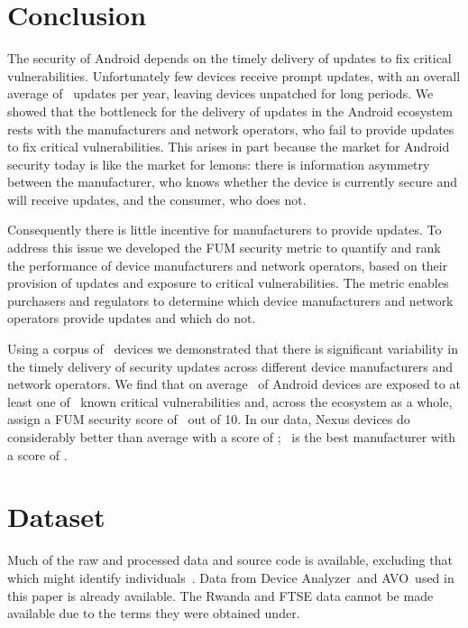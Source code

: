 \documentclass{sig-alternate-2013}
\newcommand{\da}{Device Analyzer}
\newcommand{\avo}{AVO}
\begin{document}
\section{Conclusion}
The security of Android depends on the timely delivery of updates to fix critical vulnerabilities.
Unfortunately few devices receive prompt updates, with an overall average of \daUpdatesPerYearNominal\ updates per year, leaving devices unpatched for long periods.
We showed that the bottleneck for the delivery of updates in the Android ecosystem rests with the manufacturers and network operators, who fail to provide updates to fix critical vulnerabilities.
This arises in part because the market for Android security today is like the market for lemons: there is information asymmetry between the manufacturer, who knows whether the device is currently secure and will receive updates, and the consumer, who does not.

Consequently there is little incentive for manufacturers to provide updates.
To address this issue we developed the FUM security metric to quantify and rank the performance of device manufacturers and network operators, based on their provision of updates and exposure to critical vulnerabilities.
The metric enables purchasers and regulators to determine which device manufacturers and network operators provide updates and which do not.

Using a corpus of \daNumOSDevices\ devices we demonstrated that there is significant variability in the timely delivery of security updates across different device manufacturers and network operators.
We find that on average \daMeanInsecurityPercNominal\ of Android devices are exposed to at least one of \daNumVulnsUsed\ known critical vulnerabilities and, across the ecosystem as a whole, assign a FUM security score of \daSecurityScoreNominal\ out of 10. In our data, Nexus devices do considerably better than average with a score of \daSecScoreBestsummaryScoreNominal; \daSecScoreBestmanufacturer\ is the best manufacturer with a score of \daSecScoreBestmanufacturerScoreNominal.

\section*{Dataset}
Much of the raw and processed data and source code is available, excluding that which might identify individuals~\cite{Thomas2015e}.
Data from \da\ and \avo\ used in this paper is already available.
The Rwanda and FTSE data cannot be made available due to the terms they were obtained under.
\end{document}
